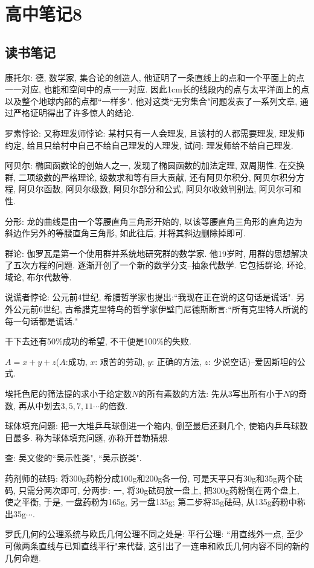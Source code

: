 \chapter{高中笔记8}
\section{读书笔记}
康托尔: 德, 数学家, 集合论的创造人, 他证明了一条直线上的点和一个平面上的点一一对应, 也能和空间中的点一一对应.
因此1cm长的线段内的点与太平洋面上的点以及整个地球内部的点都``一样多". 他对这类``无穷集合"问题发表了一系列文章,
通过严格证明得出了许多惊人的结论.

罗素悖论: 又称理发师悖论: 某村只有一人会理发, 且该村的人都需要理发, 理发师约定, 给且只给村中自己不给自己理发的人理发, 
试问: 理发师给不给自己理发.

阿贝尔: 椭圆函数论的创始人之一, 发现了椭圆函数的加法定理, 双周期性. 在交换群, 二项级数的严格理论, 级数求和等有巨大贡献,
还有阿贝尔积分, 阿贝尔积分方程, 阿贝尔函数, 阿贝尔级数, 阿贝尔部分和公式, 阿贝尔收敛判别法, 阿贝尔可和性.

分形: 龙的曲线是由一个等腰直角三角形开始的, 以该等腰直角三角形的直角边为斜边作另外的等腰直角三角形, 如此往后, 
并将其斜边删除掉即可.

群论: 伽罗瓦是第一个使用群并系统地研究群的数学家. 他19岁时, 用群的思想解决了五次方程的问题. 逐渐开创了一个新的数学分支--抽象代数学.
它包括群论, 环论, 域论, 布尔代数等.

说谎者悖论: 公元前4世纪, 希腊哲学家也提出:``我现在正在说的这句话是谎话". 另外公元前6世纪,
古希腊克里特鸟的哲学家伊壁门尼德斯断言:``所有克里特人所说的每一句话都是谎话."

干下去还有50\%成功的希望, 不干便是100\%的失败.

$A=x+y+z$($A$:成功, $x$: 艰苦的劳动, $y$: 正确的方法, $z$: 少说空话)--爱因斯坦的公式.

埃托色尼的筛法提的求小于给定数$N$的所有素数的方法: 先从3写出所有小于$N$的奇数, 
再从中划去$3, 5, 7, 11\cdots$的倍数.

球体填充问题: 把一大堆乒乓球倒进一个箱内, 倒至最后还剩几个, 使箱内乒乓球数目最多. 称为球体填充问题, 亦称开普勒猜想.

查: 吴文俊的``吴示性类", ``吴示嵌类".

药剂师的砝码: 将300g药粉分成100g和200g各一份, 可是天平只有30g和35g两个砝码, 只需分两次即可, 分两步:
一, 将30g砝码放一盘上, 把300g药粉倒在两个盘上, 使之平衡, 于是, 一盘药粉为165g, 另一盘135g; 第二步将35g砝码, 
从135g药粉中称出35g$\cdots$.

罗氏几何的公理系统与欧氏几何公理不同之处是: 平行公理: ``用直线外一点, 至少可做两条直线与已知直线平行"来代替,
这引出了一连串和欧氏几何内容不同的新的几何命题.

